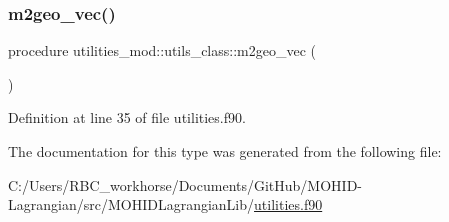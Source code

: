 \mbox{\label{structutilities__mod_1_1utils__class_a8319bf9d14dd225be0f30f5e0c1f04e3}} 
\subsubsection{\texorpdfstring{m2geo\+\_\+vec()}{m2geo\_vec()}}
{\footnotesize\ttfamily procedure utilities\+\_\+mod\+::utils\+\_\+class\+::m2geo\+\_\+vec (\begin{DoxyParamCaption}{ }\end{DoxyParamCaption})\hspace{0.3cm}{\ttfamily [private]}}



Definition at line 35 of file utilities.\+f90.



The documentation for this type was generated from the following file\+:\begin{DoxyCompactItemize}
\item 
C\+:/\+Users/\+R\+B\+C\+\_\+workhorse/\+Documents/\+Git\+Hub/\+M\+O\+H\+I\+D-\/\+Lagrangian/src/\+M\+O\+H\+I\+D\+Lagrangian\+Lib/\mbox{\hyperlink{utilities_8f90}{utilities.\+f90}}\end{DoxyCompactItemize}
